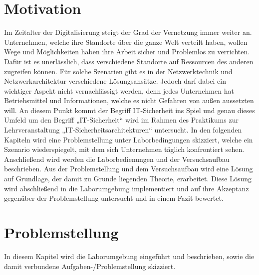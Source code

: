 \documentclass[
a4paper,     %
 headsepline, %
footsepline, %
titlepage,   %
 halfparskip,     %
 fleqn,       %
12pt         %
]{scrartcl}  %
\begin{document}
\section{Motivation}
Im Zeitalter der Digitalisierung steigt der Grad der Vernetzung immer weiter an. Unternehmen, welche ihre Standorte über die ganze Welt verteilt haben, wollen Wege und Möglichkeiten haben ihre Arbeit sicher und Problemlos zu verrichten. Dafür ist es unerlässlich, dass verschiedene Standorte auf Ressourcen des anderen zugreifen können. Für solche Szenarien gibt es in der Netzwerktechnik und Netzwerkarchitektur verschiedene Lösungsansätze. 
Jedoch darf dabei ein wichtiger Aspekt nicht vernachlässigt werden, denn jedes Unternehmen hat Betriebsmittel und Informationen, welche es nicht Gefahren von außen aussetzten will. An diesem Punkt kommt der Begriff IT-Sicherheit ins Spiel und genau dieses Umfeld um den Begriff „IT-Sicherheit“ wird im Rahmen des Praktikums zur Lehrveranstaltung „IT-Sicherheitsarchitekturen“ untersucht. 
In den folgenden Kapiteln wird eine Problemstellung unter Laborbedingungen skizziert, welche ein Szenario wiederspiegelt, mit dem sich Unternehmen täglich konfrontiert sehen. Anschließend wird werden die Laborbedienungen und der Versuchsaufbau beschrieben. Aus der Problemstellung und dem Versuchsaufbau wird eine Lösung auf Grundlage, der damit zu Grunde liegenden Theorie, erarbeitet. Diese Lösung wird abschließend in die Laborumgebung implementiert und auf ihre Akzeptanz gegenüber der Problemstellung untersucht und in einem Fazit bewertet.   
\section{Problemstellung}
In diesem Kapitel wird die Laborumgebung eingeführt und beschrieben, sowie die damit verbundene Aufgaben-/Problemstellung skizziert.
\end{document}
